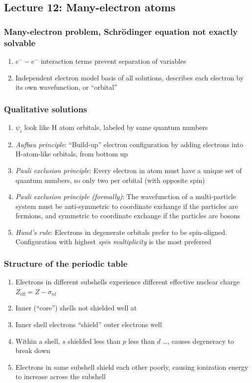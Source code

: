 \documentclass[11pt]{article}
\begin{document}
\subsection{Lecture 12: Many-electron atoms}
\label{sec:org8aebd91}
\subsubsection{Many-electron problem, Schr\"{o}dinger equation not exactly solvable}
\label{sec:org768b5cd}
\begin{enumerate}
\item \(e^- -e^-\) interaction terms prevent separation of variables
\item Independent electron model basis of all solutions, describes each electron by its own wavefunction, or ``orbital''
\end{enumerate}
\subsubsection{Qualitative solutions}
\label{sec:orgdc6c06a}
\begin{enumerate}
\item \(\psi_i\) look like H atom orbitals,  labeled by same quantum numbers
\item \emph{Aufbau principle}: ``Build-up'' electron configuration by adding electrons into H-atom-like orbitals, from bottom up
\item \emph{Pauli exclusion principle}: Every electron in atom must have a unique set of quantum numbers, so only two per orbital (with opposite spin)
\item \emph{Pauli exclusion principle (formally)}: The wavefunction of a multi-particle system must be anti-symmetric to coordinate exchange if the particles are fermions, and symmetric to coordinate exchange if the particles are bosons
\item \emph{Hund's rule}: Electrons in degenerate orbitals prefer to be spin-aligned.  Configuration with highest \emph{spin multiplicity} is the most preferred
\end{enumerate}
\subsubsection{Structure of the periodic table}
\label{sec:orgbe074dc}
\begin{enumerate}
\item Electrons in different subshells experience different effective nuclear charge \(Z_\mathrm{eff} = Z - \sigma_{nl}\)
\item Inner (``core'') shells not shielded well at
\item Inner shell electrons ``shield'' outer electrons well
\item Within a shell, \(s\) shielded less than \(p\) less than \(d\) \ldots{}, causes degeneracy to break down
\item Electrons in same subshell shield each other poorly, causing ionization energy to increase across the subshell
\end{enumerate}
\end{document}
